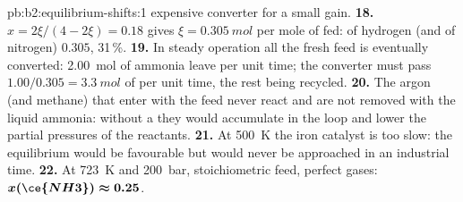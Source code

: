 \begin{solution}{pb:b2:equilibrium-shifts:1}
expensive converter for a small gain.
\textbf{18.} $x = 2\xi/(4 - 2\xi) = 0.18$ gives $\xi = \qty{0.305}{mol}$ per
mole of  fed:  of hydrogen (and of nitrogen)
$0.305$, 31\,\%.
\textbf{19.} In steady operation all the fresh feed is eventually converted:
\qty{2.00}{mol} of ammonia leave per unit time; the converter must pass $1.00/
0.305 = \qty{3.3}{mol}$ of  per unit time, the rest being recycled.
\textbf{20.} The argon (and methane) that enter with the feed never react and
are not removed with the liquid ammonia: without a  they would
accumulate in the loop and lower the partial pressures of the reactants.
\textbf{21.} At \qty{500}{K} the iron catalyst is too slow: the equilibrium
would be favourable but would never be approached in an industrial time.
\textbf{22.} At \qty{723}{K} and \qty{200}{bar}, stoichiometric feed, perfect
gases: $\boldsymbol{x(\ce{NH3}) \approx 0.25}$.
\end{solution}
